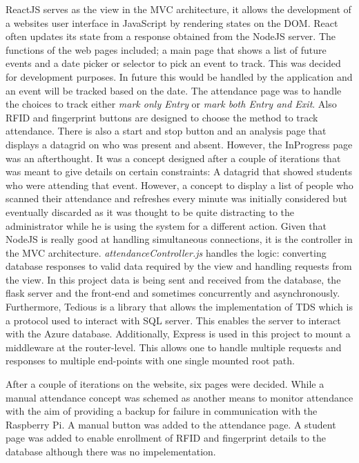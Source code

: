 ReactJS serves as the view in the \gls{MVC} architecture, it allows the development of a websites user interface in JavaScript by rendering states on the \gls{DOM}. React often updates its state from a response obtained from the NodeJS server. The functions of the web pages included; a main page that shows a list of future events and a date picker or selector to pick an event to track. This was decided for development purposes. In  future this would be handled by the application and an event will be tracked based on the date. The attendance page was to handle the choices to track either \textit{mark only Entry} or \textit{mark both Entry and Exit}. Also \gls{RFID} and fingerprint buttons are designed to choose the method to track attendance. There is also a start and stop button and an analysis page that displays a datagrid on who was present and absent. However, the InProgress page was an afterthought. It was a concept designed after a couple of iterations that was meant to give details on certain constraints: A datagrid that showed students who were attending that event. However, a concept to display a list of people who scanned their attendance and refreshes every minute was initially considered but eventually discarded as it was thought to be quite distracting to the administrator while he is using the system for a different action.
Given that NodeJS is really good at handling simultaneous connections, it  is the controller in the \gls{MVC} architecture. \textit{attendanceController.js} handles the logic: converting database responses to valid data required by the view and handling requests from the view. In this project data is being sent and received from the database, the flask server and the front-end and sometimes concurrently and asynchronously. Furthermore, Tedious is a library that allows the implementation of TDS which is a protocol used to interact with SQL server. This enables the server to interact with the Azure database. Additionally, Express is used in this project to mount a middleware at the router-level. This allows one to handle multiple requests and responses to multiple end-points with one single mounted root path.
 
After a couple of iterations on the website, six pages were decided. While a manual attendance concept was schemed as another means to monitor attendance with the aim of providing a backup for failure in communication with the Raspberry Pi. A manual button was added to the attendance page. A student page was added to enable enrollment of \gls{RFID} and fingerprint details to the database although there was no impelementation.

